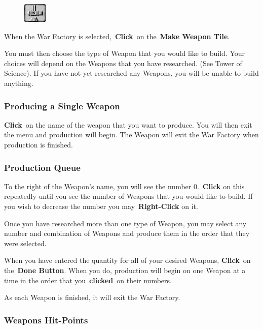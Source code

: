 \begin{figure}
	\vspace{-20pt}
	\begin{center}
		\includegraphics[width=0.1\textwidth]{Tweaponmake}
	\end{center}
	\vspace{-20pt}
\end{figure}

When the War Factory is selected, \textbf{Click} on the \textbf{Make Weapon Tile}.

You must then choose the type of Weapon that you would like to build. Your choices will depend on the Weapons that you have researched. (See Tower of Science). If you have not yet researched any Weapons, you will be unable to build anything.

\subsubsection{Producing a Single Weapon}

\textbf{Click} on the name of the weapon that you want to produce. You will then exit the menu and production will begin. The Weapon will exit the War Factory when production is finished.

\subsubsection{Production Queue}

To the right of the Weapon’s name, you will see the number 0. \textbf{Click} on this repeatedly until you see the number of Weapons that you would like to build. If you wish to decrease the number you may \textbf{Right-Click} on it.

Once you have researched more than one type of Weapon, you may select any number and combination of Weapons and produce them in the order that they were selected.

When you have entered the quantity for all of your desired Weapons, \textbf{Click} on the \textbf{Done Button}. When you do, production will begin on one Weapon at a time in the order that you \textbf{clicked} on their numbers.

As each Weapon is finished, it will exit the War Factory.

\subsubsection{Weapons Hit-Points}

